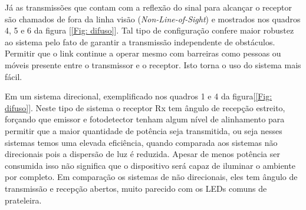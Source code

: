 Já as transmissões que contam com a reflexão do sinal para alcançar o receptor são chamados de fora da linha visão (\textit{Non-Line-of-Sight}) e mostrados nos quadros 4, 5 e 6 da figura [\ref{Fig: difuso}]. Tal tipo de configuração confere maior robustez ao sistema pelo fato de garantir a transmissão independente de obstáculos. Permitir que o link continue a operar mesmo com barreiras como pessoas ou móveis presente entre o transmissor e o receptor. Isto torna o uso do sistema mais fácil.

Em um sistema direcional, exemplificado nos quadros 1 e 4 da figura[\ref{Fig: difuso}]. Neste tipo de sistema o receptor Rx tem ângulo de recepção estreito, forçando que emissor e fotodetector tenham algum nível de alinhamento para permitir que a maior quantidade de potência seja transmitida, ou seja nesses sistemas temos uma elevada eficiência, quando comparada aos sistemas não direcionais pois a dispersão de luz é reduzida. Apesar de menos potência ser consumida isso não significa que o dispositivo será capaz de iluminar o ambiente por completo.
Em comparação os sistemas de não direcionais, eles tem ângulo de transmissão e recepção abertos, muito parecido com os LEDs comuns de prateleira. \cite{z.ghassemlooy2003}




